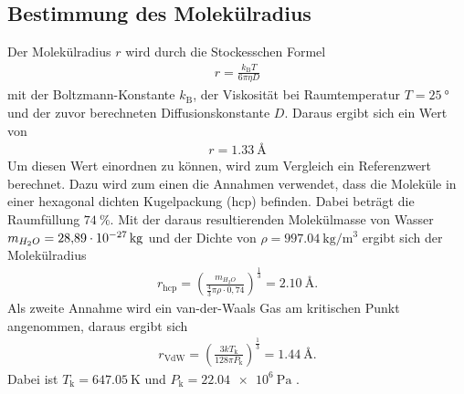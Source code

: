 \subsection{Bestimmung des Molekülradius}
\label{sec:AuswMolekuel}
Der Molekülradius $r$ wird durch die Stockesschen Formel
\begin{align*}
  r = \frac{k_\text{B} T}{6\pi\eta D}
\end{align*}
mit der Boltzmann-Konstante $k_\text{B}$, der Viskosität bei Raumtemperatur $T = \SI{25}{\degree}$
und der zuvor berechneten Diffusionskonstante $D$. Daraus ergibt sich ein Wert von
\begin{align*}
  r = \SI{1.33}{\angstrom}
\end{align*}
Um diesen Wert einordnen zu können, wird zum Vergleich ein Referenzwert berechnet.
Dazu wird zum einen die Annahmen verwendet, dass die Moleküle in einer
hexagonal dichten Kugelpackung (hcp) befinden. Dabei beträgt die Raumfüllung
$\SI{74}{\percent}$. Mit der daraus resultierenden Molekülmasse von Wasser
$m_{H_2O} = \SI{28.89d-27}{\kilo\gram}$ und der Dichte von
$\rho = \SI{997.04}{\kilo\gram\per\cubic\meter}$ \cite{hcp} ergibt sich der
Molekülradius
\begin{align*}
  r_\text{hcp} = \left(\frac{m_{H_2O}}{\frac{4}{3} \pi \rho \cdot 0,74 }\right)^\frac{1}{3} = \SI{2.10}{\angstrom}.
\end{align*}
Als zweite Annahme wird ein van-der-Waals Gas am kritischen Punkt angenommen,
daraus ergibt sich
\begin{align*}
  r_\text{VdW} = \left(\frac{3kT_\text{k}}{128\pi P_\text{k}}\right)^\frac{1}{3} = \SI{1.44}{\angstrom}.
\end{align*}
Dabei ist $T_\text{k} = \SI{647.05}{\kelvin}$ und $P_\text{k} = \SI{22.04e6}{\pascal}$ \cite{VdW}.





